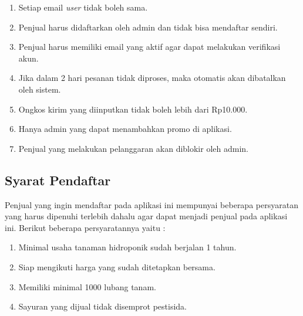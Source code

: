 
\begin{enumerate}
	\item Setiap email \textit{user} tidak boleh sama.
	\item Penjual harus didaftarkan oleh admin dan tidak bisa mendaftar sendiri.
	\item Penjual harus memiliki email yang aktif agar dapat melakukan verifikasi akun.
	\item Jika dalam 2 hari pesanan tidak diproses, maka otomatis akan dibatalkan oleh sistem.
	\item Ongkos kirim yang diinputkan tidak boleh lebih dari Rp10.000.
	\item Hanya admin yang dapat menambahkan promo di aplikasi.
	\item Penjual yang melakukan pelanggaran akan diblokir oleh admin.
\end{enumerate}

\subsection{Syarat Pendaftar}

Penjual yang ingin mendaftar pada aplikasi ini mempunyai beberapa persyaratan yang harus dipenuhi terlebih dahalu agar dapat menjadi penjual pada aplikasi ini. Berikut beberapa persyaratannya yaitu :

\begin{enumerate}
	\item Minimal usaha tanaman hidroponik sudah berjalan 1 tahun.
	\item Siap mengikuti harga yang sudah ditetapkan bersama.
	\item Memiliki minimal 1000 lubang tanam.
	\item Sayuran yang dijual tidak disemprot pestisida.
\end{enumerate}

